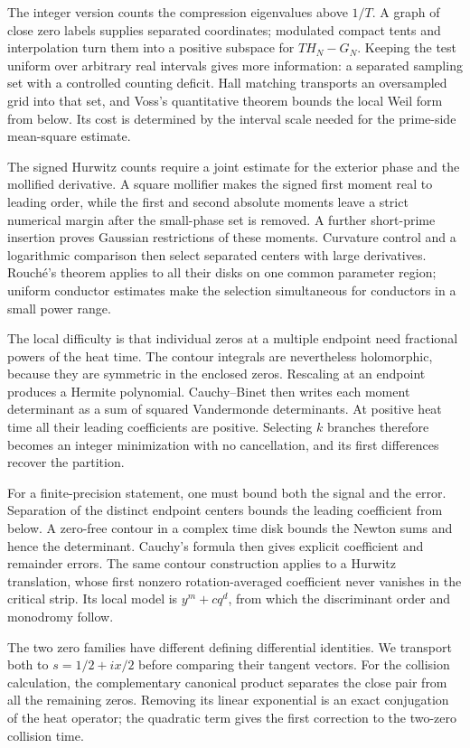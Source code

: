 \documentclass[11pt,a4paper]{article}
\theoremstyle{definition}
\theoremstyle{remark}
\begin{document}
The integer version counts the compression eigenvalues above
\(1/T\). A graph of close zero labels supplies separated coordinates;
modulated compact tents and interpolation turn them into a positive
subspace for \(TH_N-G_N\). Keeping the test uniform over arbitrary
real intervals gives more information: a separated sampling set with a
controlled counting deficit. Hall matching transports an oversampled
grid into that set, and Voss's quantitative theorem bounds the local
Weil form from below. Its cost is determined by the interval scale
needed for the prime-side mean-square estimate.

The signed Hurwitz counts require a joint estimate for the exterior
phase and the mollified derivative. A square mollifier makes the
signed first moment real to leading order, while the first and second
absolute moments leave a strict numerical margin after the small-phase
set is removed. A further short-prime insertion proves Gaussian
restrictions of these moments. Curvature control and a logarithmic
comparison then select separated centers with large derivatives.
Rouch\'e's theorem applies to all their disks on one common parameter
region; uniform conductor estimates make the selection simultaneous
for conductors in a small power range.

The local difficulty is that individual zeros at a multiple endpoint need fractional powers of the heat time. The contour integrals are nevertheless holomorphic, because they are symmetric in the enclosed zeros. Rescaling at an endpoint produces a Hermite polynomial. Cauchy--Binet then writes each moment determinant as a sum of squared Vandermonde determinants. At positive heat time all their leading coefficients are positive. Selecting $k$ branches therefore becomes an integer minimization with no cancellation, and its first differences recover the partition.

For a finite-precision statement, one must bound both the signal and the error. Separation of the distinct endpoint centers bounds the leading coefficient from below. A zero-free contour in a complex time disk bounds the Newton sums and hence the determinant. Cauchy's formula then gives explicit coefficient and remainder errors. The same contour construction applies to a Hurwitz translation, whose first nonzero rotation-averaged coefficient never vanishes in the critical strip. Its local model is $y^m+cq^d$, from which the discriminant order and monodromy follow.

The two zero families have different defining differential identities. We transport both to $s=1/2+ix/2$ before comparing their tangent vectors. For the collision calculation, the complementary canonical product separates the close pair from all the remaining zeros. Removing its linear exponential is an exact conjugation of the heat operator; the quadratic term gives the first correction to the two-zero collision time.
\end{document}
